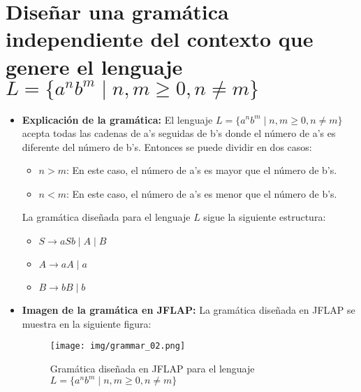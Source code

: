 \documentclass[11pt]{report}
\begin{document}
\section{Diseñar una gramática independiente del contexto que genere el lenguaje \texorpdfstring{$L = \{a^n b^m \mid n, m \geq 0, n \neq m\}$}{L = \{a^n b^m | n, m >= 0, n ≠ m\}}}
\begin{itemize}
  \item \textbf{Explicación de la gramática:}  El lenguaje $L = \{a^n b^m \mid n, m \geq 0, n \neq m\}$ acepta todas las cadenas de a's seguidas de b's donde el número de a's es diferente del número de b's. Entonces se puede
  dividir en dos casos:
  \begin{itemize}
    \item $n > m$: En este caso, el número de a's es mayor que el número de b's.
    \item $n < m$: En este caso, el número de a's es menor que el número de b's.
  \end{itemize} 
  La gramática diseñada para el lenguaje $L$ sigue la siguiente estructura:
  \begin{itemize}
    \item $S \rightarrow aSb \mid A \mid B$
    \item $A \rightarrow aA \mid a$
    \item $B \rightarrow bB \mid b$
  \end{itemize}
  \item \textbf{Imagen de la gramática en JFLAP:} La gramática diseñada en JFLAP se muestra en la siguiente figura:
  \begin{figure}[H]
    \centering
    \texttt{[image: img/grammar\_02.png]}
    \caption{Gramática diseñada en JFLAP para el lenguaje $L = \{a^n b^m \mid n, m \geq 0, n \neq m\}$}
  \end{figure}

  \newpage


\end{itemize}
\end{document}

